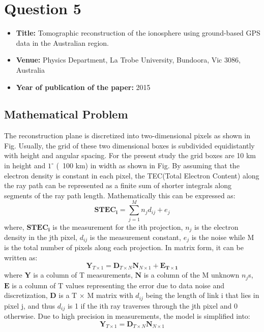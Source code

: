 \documentclass[12pt]{article}
\begin{document}
\section*{Question 5}
\begin{itemize}
    \item \textbf{Title:} Tomographic reconstruction of the ionosphere using ground-based GPS data in the Australian region.
    \item \textbf{Venue:}  Physics Department, La Trobe University, Bundoora, Vic 3086, Australia
    \item \textbf{Year of publication of the paper:} 2015
\end{itemize}
\subsection*{Mathematical Problem}
The reconstruction plane is discretized into two-dimensional pixels as shown in Fig. Usually, the grid of these two dimensional boxes is subdivided equidistantly with height and angular spacing. For the present study the grid boxes are 10 km in height and $1^\circ$ (~100 km) in width as shown in Fig. By assuming that the electron density is constant in each pixel, the TEC(Total Electron Content) along the ray path can be represented as a finite sum of shorter integrals along segments of the ray path length. Mathematically this can be expressed as:
\begin{equation*}
    \boldsymbol{STEC_i} = \sum_{j=1}^{M}n_jd_{ij}+e_j
\end{equation*}
where, $\boldsymbol{STEC_i}$ is the measurement for the ith projection, $n_j$ is the electron density in the jth pixel, $d_{ij}$ is the measurement constant, $e_j$ is the noise while M is the total number of pixels along each projection. In matrix form, it can be written as:
\begin{equation*}
    \boldsymbol{Y}_{T\times1} = \boldsymbol{D}_{T\times N}\boldsymbol{N}_{N\times1} + \boldsymbol{E_{T\times1}}
\end{equation*}
where $\boldsymbol{Y}$ is a column of T measurements, $\boldsymbol{N}$ is a column of the M unknown $n_j$s, $\boldsymbol{E}$ is a column of T values representing the error due to data noise and discretization, $\boldsymbol{D}$ is a T × M matrix with $d_{ij}$ being the length of link i that lies in pixel j, and thus $d_{ij}$ is 1 if the ith ray traverses through the jth pixel and 0 otherwise. Due to high precision in measurements, the model is simplified into:
\begin{equation*}
    \boldsymbol{Y}_{T\times1} = \boldsymbol{D}_{T\times N}\boldsymbol{N}_{N\times1}
\end{equation*}
\end{document}
